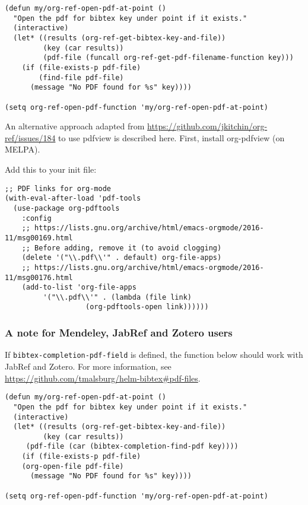 \documentclass[11pt]{article}
\begin{document}
\begin{verbatim}
(defun my/org-ref-open-pdf-at-point ()
  "Open the pdf for bibtex key under point if it exists."
  (interactive)
  (let* ((results (org-ref-get-bibtex-key-and-file))
         (key (car results))
         (pdf-file (funcall org-ref-get-pdf-filename-function key)))
    (if (file-exists-p pdf-file)
        (find-file pdf-file)
      (message "No PDF found for %s" key))))

(setq org-ref-open-pdf-function 'my/org-ref-open-pdf-at-point)
\end{verbatim}

An alternative approach adapted from \url{https://github.com/jkitchin/org-ref/issues/184} to use pdfview is described here. First, install org-pdfview (on MELPA).

Add this to your init file:

\begin{verbatim}
;; PDF links for org-mode
(with-eval-after-load 'pdf-tools
  (use-package org-pdftools
    :config
    ;; https://lists.gnu.org/archive/html/emacs-orgmode/2016-11/msg00169.html
    ;; Before adding, remove it (to avoid clogging)
    (delete '("\\.pdf\\'" . default) org-file-apps)
    ;; https://lists.gnu.org/archive/html/emacs-orgmode/2016-11/msg00176.html
    (add-to-list 'org-file-apps
		 '("\\.pdf\\'" . (lambda (file link)
				   (org-pdftools-open link))))))
\end{verbatim}

\subsubsection{A note for Mendeley, JabRef and Zotero users}
\label{sec:org6ee14bc}

If \texttt{bibtex-completion-pdf-field} is defined, the function below should work with JabRef and Zotero. For more information, see \url{https://github.com/tmalsburg/helm-bibtex\#pdf-files}.

\begin{verbatim}
(defun my/org-ref-open-pdf-at-point ()
  "Open the pdf for bibtex key under point if it exists."
  (interactive)
  (let* ((results (org-ref-get-bibtex-key-and-file))
         (key (car results))
	 (pdf-file (car (bibtex-completion-find-pdf key))))
    (if (file-exists-p pdf-file)
	(org-open-file pdf-file)
      (message "No PDF found for %s" key))))

(setq org-ref-open-pdf-function 'my/org-ref-open-pdf-at-point)
\end{verbatim}
\end{document}
